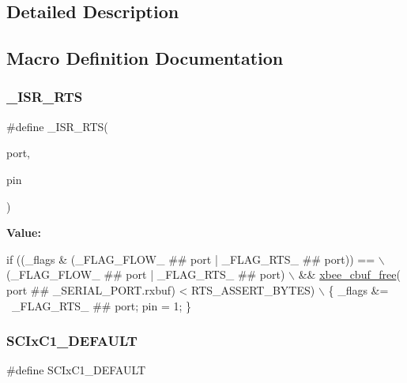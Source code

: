 \subsection{Detailed Description}


\subsection{Macro Definition Documentation}
\mbox{\label{group__hal__hcs08_gabe88e9fb750b4a68d47144afec1c7378}} 
\subsubsection{\texorpdfstring{\+\_\+\+I\+S\+R\+\_\+\+R\+TS}{\_ISR\_RTS}}
{\footnotesize\ttfamily \#define \+\_\+\+I\+S\+R\+\_\+\+R\+TS(\begin{DoxyParamCaption}\item[{}]{port,  }\item[{}]{pin }\end{DoxyParamCaption})}

{\bfseries Value\+:}
\begin{DoxyCode}
\textcolor{keywordflow}{if} ((\_flags & (\_FLAG\_FLOW\_ ## port | \_FLAG\_RTS\_ ## port)) ==            \(\backslash\)
                  (\_FLAG\_FLOW\_ ## port | \_FLAG\_RTS\_ ## port)               \(\backslash\)
      && \hyperlink{group__util__cbuf_ga9a2eeedf642bdf31dba98aacdc5a7d75}{xbee\_cbuf\_free}( port ## \_SERIAL\_PORT.rxbuf) < RTS\_ASSERT\_BYTES) \(\backslash\)
   \{ \_flags &= ~\_FLAG\_RTS\_ ## port; pin = 1; \}
\end{DoxyCode}
\mbox{\label{group__hal__hcs08_ga955444f1940e1c003043a26082c7ce37}} 
\subsubsection{\texorpdfstring{S\+C\+Ix\+C1\+\_\+\+D\+E\+F\+A\+U\+LT}{SCIxC1\_DEFAULT}}
{\footnotesize\ttfamily \#define S\+C\+Ix\+C1\+\_\+\+D\+E\+F\+A\+U\+LT}

